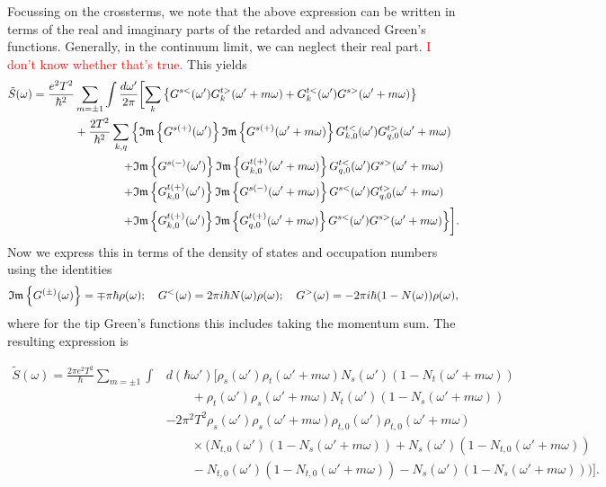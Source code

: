 Focussing on the crossterms, we note that the above expression can be written in terms of the real and imaginary parts of the retarded and advanced Green's functions. Generally, in the continuum limit, we can neglect their real part. \textcolor{red}{I don't know whether that's true.} This yields
\begin{align}
    \tilde{S}(\omega) = \frac{e^2T^2}{\hbar^2}&\sum_{m=\pm1}\int\frac{d\omega'}{2\pi}\biggl[\sum_k \left\{G^{s<}(\omega')G^{t>}_k(\omega'+m\omega) + G^{t<}_k(\omega')G^{s>}(\omega'+m\omega)\right\}\nonumber\\
    & +\frac{2T^2}{\hbar^2}\sum_{k,q}\left\{\mathfrak{Im}\left\{G^{s(+)}(\omega')\right\}\mathfrak{Im}\left\{G^{s(+)}(\omega'+m\omega)\right\}G^{t<}_{k,0}(\omega')G^{t>}_{q,0}(\omega'+m\omega)\right.\nonumber\\
    &\left.\qquad\qquad+\mathfrak{Im}\left\{G^{s(-)}(\omega')\right\}\mathfrak{Im}\left\{G^{t(+)}_{k,0}(\omega'+m\omega)\right\}G^{t<}_{q,0}(\omega')G^{s>}(\omega'+m\omega)\nonumber\right.\\
    &\left.\qquad\qquad+\mathfrak{Im}\left\{G^{t(+)}_{k,0}(\omega')\right\}\mathfrak{Im}\left\{G^{s(-)}(\omega'+m\omega)\right\}G^{s<}(\omega')G^{t>}_{q,0}(\omega'+m\omega)\right.\nonumber\\
    &\left.\qquad\qquad+\mathfrak{Im}\left\{G^{t(+)}_{k,0}(\omega')\right\}\mathfrak{Im}\left\{G^{t(+)}_{q,0}(\omega'+m\omega)\right\}G^{s<}(\omega')G^{s>}(\omega'+m\omega)\right\}\biggr].
\end{align}
Now we express this in terms of the density of states and occupation numbers using the identities
\begin{equation}
    \mathfrak{Im}\left\{G^{(\pm)}(\omega)\right\} = \mp\pi\hbar\rho(\omega);\quad G^{<}(\omega) = 2\pi i \hbar N(\omega)\rho(\omega);\quad G^{>}(\omega) = -2\pi i \hbar (1-N(\omega))\rho(\omega),
\end{equation}
where for the tip Green's functions this includes taking the momentum sum. The resulting expression is
\begin{tcolorbox}[colback=gray!20!white]
\begin{align}
    \tilde{S}(\omega) = \frac{2\pi e^2 T^2}{\hbar}\sum_{m=\pm 1}\int &d(\hbar\omega')\biggl[\rho_s(\omega')\rho_t(\omega'+m\omega)N_s(\omega')(1-N_t(\omega'+m\omega))\nonumber\\
    &\qquad+\rho_t(\omega')\rho_s(\omega'+m\omega)N_t(\omega')(1-N_s(\omega'+m\omega))\nonumber\\
    &-2\pi^2T^2\rho_s(\omega')\rho_s(\omega'+m\omega)\rho_{t,0}(\omega')\rho_{t,0}(\omega'+m\omega)\nonumber\\
    &\qquad\times\biggl(N_{t,0}(\omega')(1-N_s(\omega'+m\omega)) + N_s(\omega')(1-N_{t,0}(\omega'+m\omega))\nonumber\\
    &\qquad-N_{t,0}(\omega')(1-N_{t,0}(\omega'+m\omega)) -N_s(\omega')(1-N_s(\omega'+m\omega))\biggr)\biggr].
\end{align}
\end{tcolorbox}
